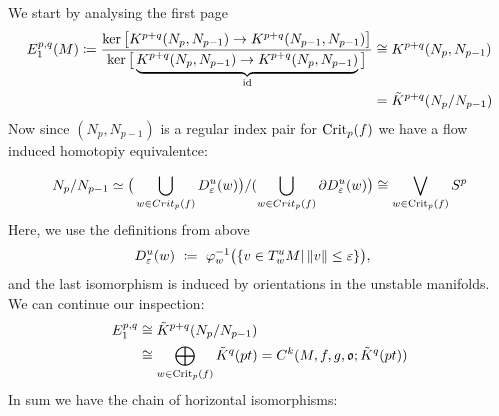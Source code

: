 \begin{cor}
    We start by analysing the first page
    \begin{align*}
        E^{p,q}_1(M)\coloneq\frac{\ker\big[K^{p+q}(N_{p},N_{p-1})\to K^{p+q}(N_{p-1},N_{p-1})  \big]}{\ker\big[\underbrace{K^{p+q}(N_{p},N_{p-1})\to K^{p+q}(N_{p},N_{p-1})}_{\text{id}}\big]} &\cong K^{p+q}(N_{p},N_{p-1})\\
        &=\tilde{K}^{p+q}(N_p\slash N_{p-1})
    \end{align*}
    Now since $(N_p,N_{p-1})$ is a regular index pair for $\mathrm{Crit}_p(f)$ we have a flow induced homotopiy equivalentce:
    
    \begin{equation*}
                         N_p\slash N_{p-1}
        \simeq          \big(\bigcup_{w\in Crit_p(f)}D^u_\varepsilon(w)\big) \slash (\bigcup_{w\in Crit_p(f)} \partial D^u_\varepsilon(w)\big)
        \cong           \bigvee_{w\in \mathrm{Crit}_p(f)}S^p
    \end{equation*} Here, we use the definitions from above
    \begin{align*}
             D^{u}_\varepsilon (w)&~\coloneq~ \varphi_w^{-1} \big(\{v\in T_w^{u }M | \left\lVert v\right\rVert\leq \varepsilon \} \big), 
    \end{align*}and the last isomorphism is induced by orientations in the unstable manifolds. We can continue our inspection:
    \begin{align*}
        E^{p,q}_1&\cong \tilde{K}^{p+q}(N_p\slash N_{p-1})\\
        &\cong \bigoplus_{w\in \mathrm{Crit}_p(f)}\tilde{K}^q(pt)=C^k(M,f,g,\mathfrak{o};\tilde{K}^q(pt))\\
    \end{align*} In sum we have the chain of horizontal isomorphisms: 
\begin{center}
\end{center}
\end{cor}
